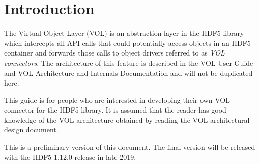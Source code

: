 

\section{Introduction}
The Virtual Object Layer (VOL) is an abstraction layer in the HDF5
library which intercepts all API calls that could potentially access
objects in an HDF5 container and forwards those calls to object drivers
referred to as \textit{VOL connectors}. The architecture of this feature
is described in the VOL User Guide and VOL Architecture and Internals
Documentation and will not be duplicated here.

This guide is for people who are interested in developing their own VOL
connector for the HDF5 library. It is assumed that the reader has good knowledge
of the VOL architecture obtained by reading the VOL architectural design
document.

This is a preliminary version of this document. The final version will be
released with the HDF5 1.12.0 release in late 2019.
